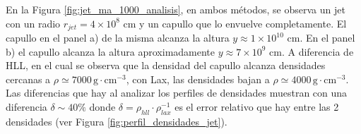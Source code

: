 \documentclass[12pt,a4paper]{book}
\begin{document}
En la Figura \ref{fig:jet_ma_1000_analisis}, en ambos métodos, se observa un jet con un radio $r_{jet} = 4 \times 10^{8} $ cm y un capullo que lo envuelve completamente. El capullo en el panel a) de la misma alcanza la altura $y \approx 1 \times 10^{10}$ cm. En el panel b) el capullo alcanza la altura aproximadamente $y \approx 7 \times 10^{9}$ cm. A diferencia de HLL, en el cual se observa que la densidad del capullo alcanza densidades cercanas a $\rho \simeq 7000 \, \mathrm{g} \cdot \mathrm{cm}^{-3}$, con Lax, las densidades bajan a $\rho \simeq 4000 \, \mathrm{g} \cdot \mathrm{cm}^{-3}$. Las diferencias que hay al analizar los perfiles de densidades muestran con  una diferencia $\delta \sim 40\%$ donde  $\delta = \rho_{hll} \cdot \rho_{lax}^{-1}$ es el error relativo que hay entre las 2 densidades (ver Figura \ref{fig:perfil_densidades_jet}).
 
\end{document}

